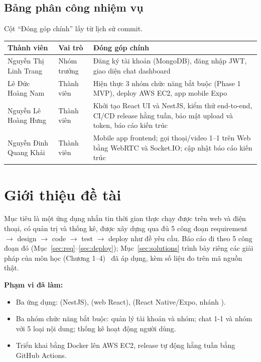 \documentclass[11pt, a4paper]{article}
\begin{document}
\subsection{Bảng phân công nhiệm vụ}
Cột ``Đóng góp chính'' lấy từ lịch sử commit.

\begin{table}[H]
  \centering
  \small
  \begin{tabularx}{\linewidth}{llY}
    \toprule
    \textbf{Thành viên} & \textbf{Vai trò} & \textbf{Đóng góp chính} \\
    \midrule
    Nguyễn Thị Linh Trang & Nhóm trưởng & Đăng ký tài khoản (MongoDB), đăng nhập JWT, giao diện chat dashboard \\
    Lê Đức Hoàng Nam & Thành viên & Hiện thực 3 nhóm chức năng bắt buộc (Phase 1 MVP), deploy AWS EC2, app mobile Expo \\
    Nguyễn Lê Hoàng Hưng & Thành viên & Khởi tạo React UI và NestJS, kiểm thử end-to-end, CI/CD release hằng tuần, bảo mật upload và token, báo cáo kiến trúc \\
    Nguyễn Đinh Quang Khải & Thành viên & Mobile app frontend; gọi thoại/video 1--1 trên Web bằng WebRTC và Socket.IO; cập nhật báo cáo kiến trúc \\
    \bottomrule
  \end{tabularx}
\end{table}

\section{Giới thiệu đề tài}

Mục tiêu là một ứng dụng nhắn tin thời gian thực chạy được trên web và điện thoại, có quản trị và thống kê, được xây dựng qua đủ 5 công đoạn requirement $\rightarrow$ design $\rightarrow$ code $\rightarrow$ test $\rightarrow$ deploy như đề yêu cầu. Báo cáo đi theo 5 công đoạn đó (Mục~\ref{sec:req}--\ref{sec:deploy}); Mục~\ref{sec:solutions} trình bày riêng các giải pháp của môn học (Chương 1--4)~\cite{phat2025slides} đã áp dụng, kèm số liệu đo trên mã nguồn thật.

\textbf{Phạm vi đã làm:}
\begin{itemize}
  \item Ba ứng dụng:  (NestJS),  (web React),  (React Native/Expo, nhánh ).
  \item Ba nhóm chức năng bắt buộc: quản lý tài khoản và nhóm; chat 1-1 và nhóm với 5 loại nội dung; thống kê hoạt động người dùng.
  \item Triển khai bằng Docker lên AWS EC2, release tự động hằng tuần bằng GitHub Actions.
\end{itemize}
\end{document}
